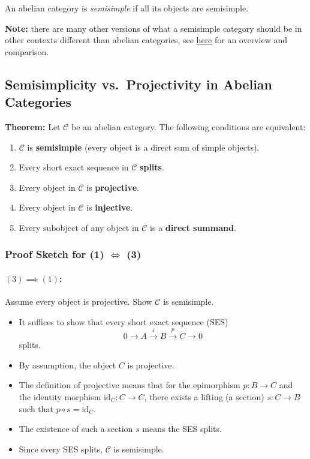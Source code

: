 \documentclass[11pt]{article}
\theoremstyle{definition}
\begin{document}
An abelian category is \emph{semisimple} if all its objects are semisimple.

\medskip
\noindent\textbf{Note:} there are many other versions of what a semisimple category should be in other contexts different than abelian categories, see \href{https://jameshbailie.github.io/Papers/papers/Semisimple.pdf}{here} for an overview and comparison.



\subsection{Semisimplicity vs.\ Projectivity in Abelian Categories}

\textbf{Theorem:}
Let \(\mathcal{C}\) be an abelian category. The following conditions are equivalent:
\begin{enumerate}
    \item \(\mathcal{C}\) is \textbf{semisimple} (every object is a direct sum of simple objects).
    \item Every short exact sequence in \(\mathcal{C}\) \textbf{splits}.
    \item Every object in \(\mathcal{C}\) is \textbf{projective}.
    \item Every object in \(\mathcal{C}\) is \textbf{injective}.
    \item Every subobject of any object in \(\mathcal{C}\) is a \textbf{direct summand}.
\end{enumerate}


\subsubsection*{Proof Sketch for (1) \(\iff\) (3)}

\paragraph{\((3) \implies (1)\):} Assume every object is projective. Show \(\mathcal{C}\) is semisimple.
\begin{itemize}
    \item It suffices to show that every short exact sequence (SES) 
    \[
    0 \to A \xrightarrow{i} B \xrightarrow{p} C \to 0
    \]
    splits.
    \item By assumption, the object \(C\) is projective.
    \item The definition of projective means that for the epimorphism \(p: B \to C\) and the identity morphism \(\mathrm{id}_C: C \to C\), there exists a lifting (a section) \(s: C \to B\) such that \(p \circ s = \mathrm{id}_C\).
    \item The existence of such a section \(s\) means the SES splits.
    \item Since every SES splits, \(\mathcal{C}\) is semisimple.
\end{itemize}
\end{document}
